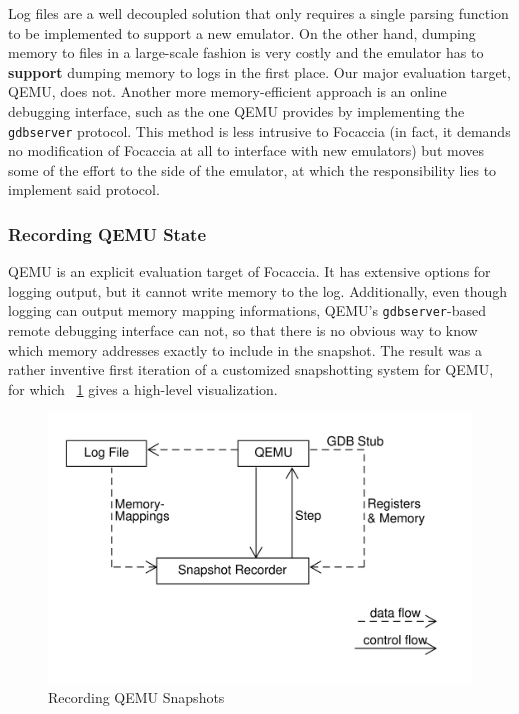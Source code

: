 Log files are a well decoupled solution that only requires a single parsing function to be implemented to support a new
emulator. On the other hand, dumping memory to files in a large-scale fashion is very costly and the emulator has to
\textbf{support} dumping memory to logs in the first place. Our major evaluation target, QEMU, does not. Another more
memory-efficient approach is an online debugging interface, such as the one QEMU provides by implementing the
\texttt{gdbserver} protocol. This method is less intrusive to Focaccia (in fact, it demands no modification of Focaccia
at all to interface with new emulators) but moves some of the effort to the side of the emulator, at which the
responsibility lies to implement said protocol.

\subsubsection{Recording QEMU State}

QEMU is an explicit evaluation target of Focaccia. It has extensive options for logging output, but it cannot write
memory to the log. Additionally, even though logging can output memory mapping informations, QEMU's
\texttt{gdbserver}-based remote debugging interface can not, so that there is no obvious way to know which memory
addresses exactly to include in the snapshot. The result was a rather inventive first iteration of a customized
snapshotting system for QEMU, for which \figurename~\ref{fig:qemu_naive_recording} gives a high-level visualization.

\begin{figure}[htpb]
    \centering
    \includegraphics[width=0.8\linewidth]{figures/qemu_naive_recording.png}
    \caption{Recording QEMU Snapshots}\label{fig:qemu_naive_recording}
\end{figure}

